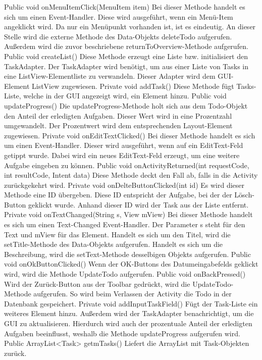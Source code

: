 Public void onMenuItemClick(MenuItem item)
Bei dieser Methode handelt es sich um einen Event-Handler. Diese wird ausgeführt, wenn ein Menü-Item angeklickt wird. Da nur ein Menüpunkt vorhanden ist, ist es eindeutig. An dieser Stelle wird die externe Methode des Data-Objekts deleteTodo aufgerufen. Außerdem wird die zuvor beschriebene returnToOverview-Methode aufgerufen.
Public void createList()
Diese Methode erzeugt eine Liste bzw. initialisiert den TaskAdapter. Der TaskAdapter wird benötigt, um aus einer Liste von Tasks in eine ListView-Elementliste zu verwandeln. Dieser Adapter wird dem GUI-Element ListView zugewiesen.
Private void addTask()
Diese Methode fügt Tasks-Liste, welche in der GUI angezeigt wird, ein Element hinzu.
Public void updateProgress()
Die updateProgress-Methode holt sich aus dem Todo-Objekt den Anteil der erledigten Aufgaben. Dieser Wert wird in eine Prozentzahl umgewandelt. Der Prozentwert wird dem entsprechenden Layout-Element zugewiesen.
Private void onEditTextClicked()
Bei dieser Methode handelt es sich um einen Event-Handler. Dieser wird ausgeführt, wenn auf ein EditText-Feld getippt wurde. Dabei wird ein neues EditText-Feld erzeugt, um eine weitere Aufgabe eingeben zu können.
Public void onActivityReturned(int requestCode, int resultCode, Intent data)
	Diese Methode deckt den Fall ab, falls in die Activity zurückgekehrt wird.
Private void onDelteButtonClicked(int id)
Es wird dieser Methode eine ID übergeben. Diese ID entspricht der Aufgabe, bei der der Lösch-Button geklickt wurde. Anhand dieser ID wird der Task aus der Liste entfernt.
Private void onTextChanged(String s, View mView)
Bei dieser Methode handelt es sich um einen Text-Changed Event-Handler. Der Parameter s steht für den Text und mView für das Element. Handelt es sich um den Titel, wird die setTitle-Methode des Data-Objekts aufgerufen. Handelt es sich um die Beschreibung, wird die setText-Methode desselbigen Objekts aufgerufen.
Public void onOkButtonClicked()
Wenn der OK-Buttons des Datumeingabefelds geklickt wird, wird die Methode UpdateTodo aufgerufen.
Public void onBackPressed()
Wird der Zurück-Button aus der Toolbar gedrückt, wird die UpdateTodo-Methode aufgerufen. So wird beim Verlassen der Activity die Todo in der Datenbank gespeichert.
Private void addInputTaskField()
Fügt der Task-Liste ein weiteres Element hinzu. Außerdem wird der TaskAdapter benachrichtigt, um die GUI zu aktualisieren. Hierdurch wird auch der prozentuale Anteil der erledigten Aufgaben beeinflusst, weshalb die Methode updateProgress aufgerufen wird.
Public ArrayList<Task> getmTasks()
Liefert die ArrayList mit Task-Objekten zurück.

